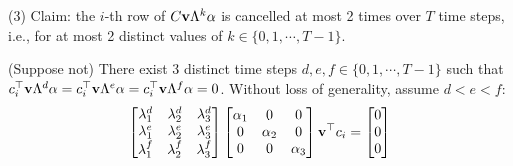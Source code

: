 \documentclass[twocolumn]{autart}    %
\begin{document}
{%
(3) Claim: the $i$-th row of $C{\bf v}\Lambda^k \alpha$ is cancelled at most 2 times over $T$ time steps, i.e., for at most 2 distinct values of $k \in \{0, 1, \cdots, T-1\}$. 
	
	(Suppose not) There exist 3 distinct time steps $d, e, f \in \{0, 1, \cdots, T-1\}$ such that $c_i^\top {\bf v} \Lambda^d \alpha = c_i^\top {\bf v} \Lambda^e \alpha = c_i^\top {\bf v} \Lambda^f \alpha = 0$. Without loss of generality, assume $d<e<f$:
	\begin{equation}
		\begin{bmatrix} \lambda_1^d & \lambda_2^d & \lambda_3^d \\
					\lambda_1^e & \lambda_2^e & \lambda_3^e \\
					\lambda_1^f & \lambda_2^f & \lambda_3^f 
		\end{bmatrix}
		\begin{bmatrix} \alpha_1 & 0 & 0 \\ 0 & \alpha_2 & 0 \\ 0 & 0 & \alpha_3 \end{bmatrix} {\bf v}^\top c_i 
		= \begin{bmatrix} 0 \\ 0 \\ 0 \end{bmatrix} \nonumber
	\end{equation}
	
}
\end{document}
